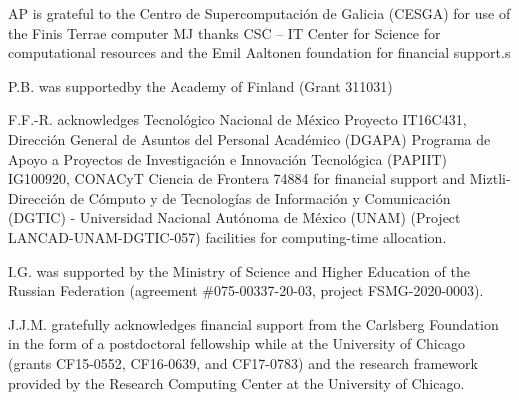 \documentclass[aps,prl,superscriptaddress,twocolumn]{revtex4}
\begin{document}
\begin{acknowledgments}
AP is grateful to the Centro de
Supercomputación de Galicia (CESGA) for use of the Finis
Terrae computer
%
MJ thanks CSC -- IT Center for Science for computational resources and the Emil Aaltonen foundation for financial support.s

P.B. was supportedby the Academy of Finland (Grant 311031)

F.F.-R. acknowledges Tecnol\'{o}gico Nacional de M\'{e}xico Proyecto IT16C431, Direcci\'{o}n General de Asuntos del Personal Acad\'{e}mico (DGAPA) Programa de Apoyo a Proyectos de Investigaci\'{o}n e Innovaci\'{o}n Tecnol\'{o}gica (PAPIIT) IG100920, CONACyT Ciencia de Frontera 74884 for financial support and Miztli-Direcci\'{o}n de C\'{o}mputo y de Tecnolog\'{i}as de Informaci\'{o}n y Comunicaci\'{o}n (DGTIC) - Universidad Nacional Aut\'{o}noma de México (UNAM) (Project LANCAD-UNAM-DGTIC-057) facilities for computing-time allocation.

I.G. was supported by the Ministry of Science and Higher Education of the Russian Federation (agreement \#075-00337-20-03, project FSMG-2020-0003). 

J.J.M. gratefully acknowledges financial support from the Carlsberg 
Foundation in the form of a postdoctoral fellowship while at 
the University of Chicago (grants CF15-0552, CF16-0639, and 
CF17-0783) and the research framework provided by the 
Research Computing Center at the University of Chicago.

\end{acknowledgments}





\listoftodos
\end{document}
